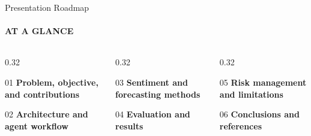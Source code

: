 \documentclass[aspectratio=169,11pt]{beamer}
\newcommand{\keyphrase}[1]{\textbf{\color{DELCONred}#1}}
\begin{document}
\begin{frame}{Presentation Roadmap}
  \framesubtitle{AT A GLANCE}
  \begin{columns}[T,onlytextwidth]
    \begin{column}{0.32\textwidth}
      \begin{block}{\Large\color{DELCONgold}01}
        \keyphrase{Problem, objective, and contributions}
      \end{block}
      \vspace{0.12cm}
      \begin{block}{\Large\color{DELCONgold}02}
        \keyphrase{Architecture and agent workflow}
      \end{block}
    \end{column}
    \begin{column}{0.32\textwidth}
      \begin{block}{\Large\color{DELCONgold}03}
        \keyphrase{Sentiment and forecasting methods}
      \end{block}
      \vspace{0.12cm}
      \begin{block}{\Large\color{DELCONgold}04}
        \keyphrase{Evaluation and results}
      \end{block}
    \end{column}
    \begin{column}{0.32\textwidth}
      \begin{block}{\Large\color{DELCONgold}05}
        \keyphrase{Risk management and limitations}
      \end{block}
      \vspace{0.12cm}
      \begin{block}{\Large\color{DELCONgold}06}
        \keyphrase{Conclusions and references}
      \end{block}
    \end{column}
  \end{columns}
\end{frame}
\end{document}
